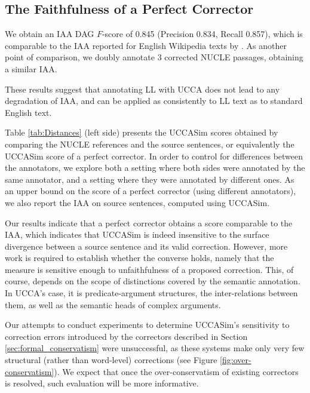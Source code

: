 \documentclass[letter,11pt]{article}
\begin{document}
\subsection{The Faithfulness of a Perfect Corrector}

We obtain an IAA DAG $F$-score of 0.845
(Precision 0.834, Recall 0.857), which
is comparable to the IAA reported for English Wikipedia texts by \cite{abend2013universal}.
As another point of comparison, we doubly annotate 3 corrected
NUCLE passages, obtaining a similar IAA.

These results suggest that annotating LL with UCCA does not lead to
any degradation of IAA, and can be applied as consistently to LL text as to standard English text.

Table \ref{tab:Distances} (left side)
presents the {\sc UCCASim} scores obtained by comparing the NUCLE references and the source
sentences, or equivalently the {\sc UCCASim} score of a perfect corrector.
In order to control for differences between the annotators, we explore both
a setting where both sides were annotated by the same annotator,
and a setting where they were annotated by different ones.
As an upper bound on the score of a perfect corrector (using different annotators),
we also report the IAA on source sentences, computed using {\sc UCCASim}. 

Our results indicate that a perfect corrector obtains a score comparable
to the IAA, which indicates that {\sc UCCASim} is indeed
insensitive to the surface divergence between a source sentence and its valid correction.
However, more work is required to establish whether the converse holds, namely
that the measure is sensitive enough
to unfaithfulness of a proposed correction.
This, of course, depends on the scope of distinctions covered by the semantic annotation.
In UCCA's case, it is predicate-argument structures, the inter-relations between them,
as well as the semantic heads of complex arguments.

Our attempts to conduct experiments to determine {\sc UCCASim}'s sensitivity to correction
errors introduced by the correctors described in Section \ref{sec:formal_conservatism} were
unsuccessful, as these systems make only very few structural (rather than word-level)
corrections (see Figure \ref{fig:over-conservatism}).
We expect that once the over-conservatism of existing correctors is resolved,
such evaluation will be more informative.

\end{document}
